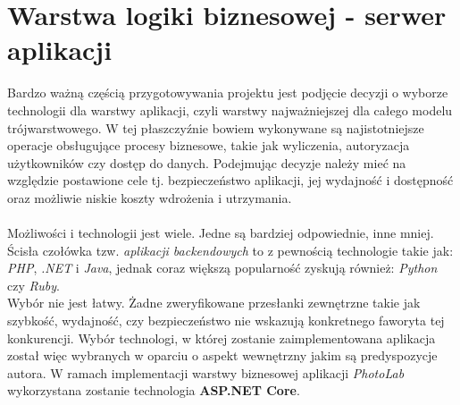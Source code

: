 \section{Warstwa logiki biznesowej - serwer aplikacji}

\quad Bardzo ważną częścią przygotowywania projektu jest podjęcie decyzji o wyborze technologii dla warstwy aplikacji, czyli warstwy najważniejszej dla całego modelu trójwarstwowego. W tej płaszczyźnie bowiem wykonywane są najistotniejsze operacje obsługujące procesy biznesowe, takie jak wyliczenia, autoryzacja użytkowników czy dostęp do danych. Podejmując decyzje należy mieć na względzie postawione cele tj. bezpieczeństwo aplikacji, jej wydajność i dostępność oraz możliwie niskie koszty wdrożenia i utrzymania. \\
\\
Możliwości i technologii jest wiele. Jedne są bardziej odpowiednie, inne mniej. Ścisła czołówka tzw. \textit{aplikacji backendowych} to z pewnością technologie takie jak: \textit{PHP}, \textit{.NET} i \textit{Java}, jednak coraz większą popularność zyskują również: \textit{Python} czy \textit{Ruby}.\\
Wybór nie jest łatwy. Żadne zweryfikowane przesłanki zewnętrzne takie jak szybkość, wydajność, czy bezpieczeństwo nie wskazują konkretnego faworyta tej konkurencji. Wybór technologi, w której zostanie zaimplementowana aplikacja został więc wybranych w oparciu o aspekt wewnętrzny jakim są predyspozycje autora. W ramach implementacji warstwy biznesowej aplikacji \textit{PhotoLab} wykorzystana zostanie technologia \textbf{ASP.NET Core}.

